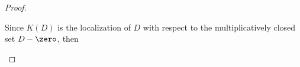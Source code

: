 \begin{proof}
\begin{enumerate}
Since $K(D)$ is the localization of $D$ with respect to the
		multiplicatively closed set $D-\zero$, then  

\end{enumerate}

%
\end{proof}%

